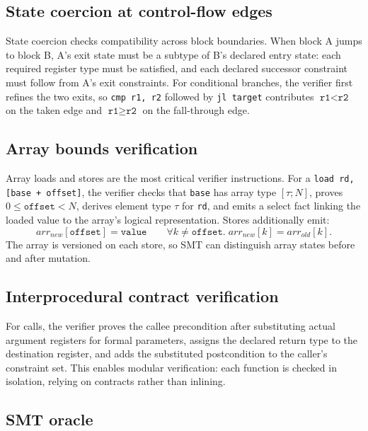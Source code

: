 \subsection{State coercion at control-flow edges}

State coercion checks compatibility across block boundaries. When block A jumps to block B, A's exit state must be a subtype of B's declared entry state: each required register type must be satisfied, and each declared successor constraint must follow from A's exit constraints. For conditional branches, the verifier first refines the two exits, so \texttt{cmp r1, r2} followed by \texttt{jl target} contributes $\texttt{r1} < \texttt{r2}$ on the taken edge and $\texttt{r1} \ge \texttt{r2}$ on the fall-through edge.

\subsection{Array bounds verification}

Array loads and stores are the most critical verifier instructions. For a \texttt{load rd, [base + offset]}, the verifier checks that \texttt{base} has array type $[\tau; N]$, proves $0 \le \texttt{offset} < N$, derives element type $\tau$ for \texttt{rd}, and emits a select fact linking the loaded value to the array's logical representation. Stores additionally emit:
\[
  \mathit{arr}_{\mathit{new}}[\texttt{offset}] = \texttt{value}
  \qquad
  \forall k \ne \texttt{offset}.\; \mathit{arr}_{\mathit{new}}[k] = \mathit{arr}_{\mathit{old}}[k].
\]
The array is versioned on each store, so SMT can distinguish array states before and after mutation.

\subsection{Interprocedural contract verification}

For calls, the verifier proves the callee precondition after substituting actual argument registers for formal parameters, assigns the declared return type to the destination register, and adds the substituted postcondition to the caller's constraint set. This enables modular verification: each function is checked in isolation, relying on contracts rather than inlining.

\subsection{SMT oracle}

